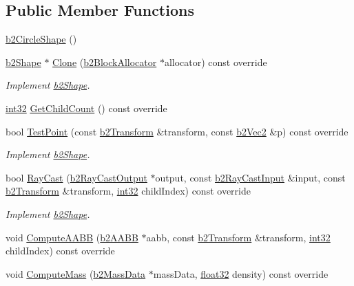 \subsection*{Public Member Functions}
\begin{DoxyCompactItemize}
\item 
\mbox{\hyperlink{classb2_circle_shape_a73bb9f0ea1c28d772db1192c52572018}{b2\+Circle\+Shape}} ()
\item 
\mbox{\hyperlink{classb2_shape}{b2\+Shape}} $\ast$ \mbox{\hyperlink{classb2_circle_shape_a5ff8fbab7dff87784fbff20b07e55cfc}{Clone}} (\mbox{\hyperlink{classb2_block_allocator}{b2\+Block\+Allocator}} $\ast$allocator) const override
\begin{DoxyCompactList}\small\item\em Implement \mbox{\hyperlink{classb2_shape}{b2\+Shape}}. \end{DoxyCompactList}\item 
\mbox{\hyperlink{b2_settings_8h_a43d43196463bde49cb067f5c20ab8481}{int32}} \mbox{\hyperlink{classb2_circle_shape_a552db3402aed5d12c3177981e5208065}{Get\+Child\+Count}} () const override
\item 
bool \mbox{\hyperlink{classb2_circle_shape_a84e22b3807e84b72f2981010fc197099}{Test\+Point}} (const \mbox{\hyperlink{structb2_transform}{b2\+Transform}} \&transform, const \mbox{\hyperlink{structb2_vec2}{b2\+Vec2}} \&p) const override
\begin{DoxyCompactList}\small\item\em Implement \mbox{\hyperlink{classb2_shape}{b2\+Shape}}. \end{DoxyCompactList}\item 
bool \mbox{\hyperlink{classb2_circle_shape_a442e847b9fc3d1344b02b48d490eb0c6}{Ray\+Cast}} (\mbox{\hyperlink{structb2_ray_cast_output}{b2\+Ray\+Cast\+Output}} $\ast$output, const \mbox{\hyperlink{structb2_ray_cast_input}{b2\+Ray\+Cast\+Input}} \&input, const \mbox{\hyperlink{structb2_transform}{b2\+Transform}} \&transform, \mbox{\hyperlink{b2_settings_8h_a43d43196463bde49cb067f5c20ab8481}{int32}} child\+Index) const override
\begin{DoxyCompactList}\small\item\em Implement \mbox{\hyperlink{classb2_shape}{b2\+Shape}}. \end{DoxyCompactList}\item 
void \mbox{\hyperlink{classb2_circle_shape_af4a4ea78780af7a7ce40bf5d54affe83}{Compute\+A\+A\+BB}} (\mbox{\hyperlink{structb2_a_a_b_b}{b2\+A\+A\+BB}} $\ast$aabb, const \mbox{\hyperlink{structb2_transform}{b2\+Transform}} \&transform, \mbox{\hyperlink{b2_settings_8h_a43d43196463bde49cb067f5c20ab8481}{int32}} child\+Index) const override
\item 
void \mbox{\hyperlink{classb2_circle_shape_a7dc07891abd015863fbf03076e47eec5}{Compute\+Mass}} (\mbox{\hyperlink{structb2_mass_data}{b2\+Mass\+Data}} $\ast$mass\+Data, \mbox{\hyperlink{b2_settings_8h_aacdc525d6f7bddb3ae95d5c311bd06a1}{float32}} density) const override
\end{DoxyCompactItemize}
